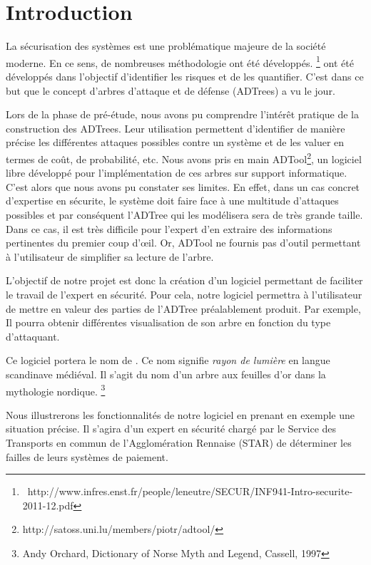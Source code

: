 \section{Introduction}
	
	La sécurisation des systèmes est une problématique majeure de la société moderne. En ce sens, de nombreuses méthodologie ont été développés. \footnote{ http://www.infres.enst.fr/people/leneutre/SECUR/INF941-Intro-securite-2011-12.pdf }
	ont été développés dans l'objectif d'identifier les risques et de les quantifier. C'est dans ce but que le concept d'arbres d'attaque et de défense (ADTrees) a vu le jour.
	
	Lors de la phase de pré-étude, nous avons pu comprendre l’intérêt pratique de la construction des ADTrees. Leur utilisation permettent d'identifier de manière précise les différentes attaques possibles contre un système et de les valuer en termes de coût, de probabilité, etc. Nous avons pris en main ADTool\footnote{http://satoss.uni.lu/members/piotr/adtool/}, un logiciel libre développé pour l'implémentation de ces arbres sur support informatique. C'est alors que nous avons pu constater ses limites. En effet, dans un cas concret d'expertise en sécurite, le système doit faire face à une multitude d'attaques possibles et par conséquent l'ADTree qui les modélisera sera de très grande taille. Dans ce cas, il est très difficile pour l'expert d'en extraire des informations pertinentes du premier coup d’œil. Or, ADTool ne fournis pas d'outil permettant à l'utilisateur de simplifier sa lecture de l'arbre. 

	L'objectif de notre projet est donc la création d'un logiciel permettant de faciliter le travail de l'expert en sécurité. Pour cela, notre logiciel permettra à l'utilisateur de mettre en valeur des parties de l'ADTree préalablement produit. Par exemple, Il pourra obtenir différentes visualisation de son arbre en fonction du type d'attaquant. %

	 Ce logiciel portera le nom de \glasir. Ce nom signifie \textit{rayon de lumière} en langue scandinave médiéval. Il s'agit du nom d'un arbre aux feuilles d'or dans la mythologie nordique. \footnote{ Andy Orchard, Dictionary of Norse Myth and Legend, Cassell,‎ 1997}

	Nous illustrerons les fonctionnalités de notre logiciel en prenant en exemple une situation précise. Il s'agira d'un expert en sécurité chargé par le Service des Transports en commun de l'Agglomération Rennaise (STAR) de déterminer les failles de leurs systèmes de paiement. 













